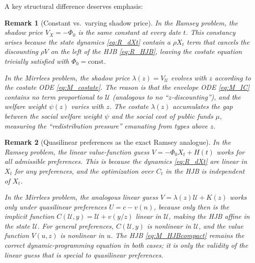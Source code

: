 \documentclass[12pt]{article}
\newtheorem{remark}{Remark}
\newcommand{\calU}{\mathcal{U}}
\begin{document}
\medskip
A key structural difference deserves emphasis:

\begin{remark}[Constant vs.\ varying shadow price]
In the Ramsey problem, the shadow price $V_X = -\Phi_0$ is the same
constant at every date $t$.  This constancy arises because the state dynamics
\eqref{eq:R_dXt} contain a $\rho X_t$ term that cancels the discounting
$\rho V$ on the left of the HJB \eqref{eq:R_HJB}, leaving the costate
equation trivially satisfied with $\Phi_0 = \text{const}$.

In the Mirrlees problem, the shadow price $\lambda(z) = V_\calU$ evolves with
$z$ according to the costate ODE \eqref{eq:M_costate}.  The reason is that
the envelope ODE \eqref{eq:M_IC} contains no term proportional to $\calU$
(analogous to no ``$z$-discounting''), and the welfare weight $\psi(z)$ varies
with $z$.  The costate $\lambda(z)$ accumulates the gap between the social
welfare weight $\psi$ and the social cost of public funds $\mu$, measuring the
``redistribution pressure'' emanating from types above $z$.
\end{remark}

\begin{remark}[Quasilinear preferences as the exact Ramsey analogue]
In the Ramsey problem, the linear value-function guess $V = -\Phi_0 X_t +
H(t)$ works for \emph{all} admissible preferences.  This is because the
dynamics \eqref{eq:R_dXt} are linear in $X_t$ for any preferences, and the
optimization over $C_t$ in the HJB is independent of $X_t$.

In the Mirrlees problem, the analogous linear guess $V = \lambda(z) \calU +
K(z)$ works only under \emph{quasilinear preferences} $U = c - v(n)$, because
only then is the implicit function $C(\calU, y) = \calU + v(y/z)$ linear in
$\calU$, making the HJB affine in the state $\calU$.  For general preferences,
$C(\calU, y)$ is nonlinear in $\calU$, and the value function $V(u,z)$ is
nonlinear in $u$.  The HJB \eqref{eq:M_HJBcompact} remains the correct
dynamic-programming equation in both cases; it is only the validity of the
\emph{linear} guess that is special to quasilinear preferences.
\end{remark}
\end{document}
